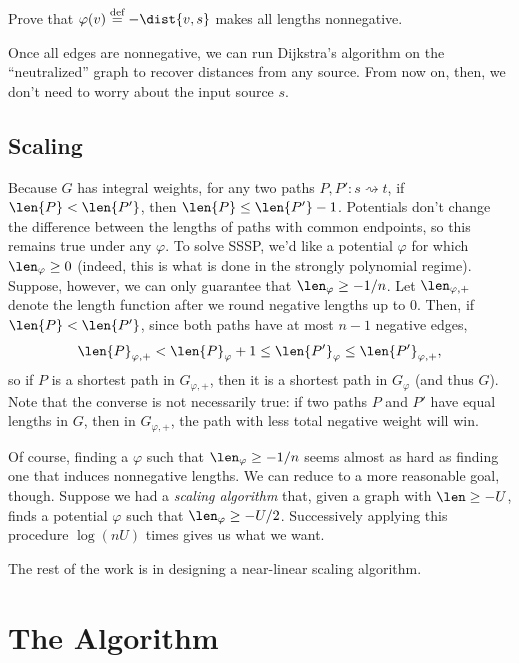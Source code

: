 \documentclass[12pt]{article}
\begin{document}
\begin{exercise}
  Prove that $\varphi(v) \defeq - \dist{v, s}$ makes all lengths nonnegative.
\end{exercise}

Once all edges are nonnegative, we can run Dijkstra's algorithm on the
``neutralized'' graph to recover distances from any source. From now on, then,
we don't need to worry about the input source $s$.

\subsection{Scaling}

Because $G$ has integral weights, for any two paths
$P, P' : s \rightsquigarrow t$, if $\len{P} < \len{P'}$, then
$\len{P} \leq \len{P'} - 1$. Potentials don't change the difference between the
lengths of paths with common endpoints, so this remains true under any
$\varphi$. To solve SSSP, we'd like a potential $\varphi$ for which
$\len_\varphi \geq 0$ (indeed, this is what is done in the strongly polynomial
regime). Suppose, however, we can only guarantee that $\len_\varphi \geq -1/n$.
Let $\len_{\varphi, +}$ denote the length function after we round negative
lengths up to $0$. Then, if $\len{P} < \len{P'}$, since both paths have at most
$n - 1$ negative edges,
\begin{align*}
  \len{P}_{\varphi, +} <    \len{P}_\varphi + 1
                       \leq \len{P'}_\varphi
                       \leq \len{P'}_{\varphi, +},
\end{align*}
so if $P$ is a shortest path in $G_{\varphi, +}$, then it is a shortest path in
$G_\varphi$ (and thus $G$). Note that the converse is not necessarily true: if
two paths $P$ and $P'$ have equal lengths in $G$, then in $G_{\varphi, +}$, the
path with less total negative weight will win.

Of course, finding a $\varphi$ such that $\len_\varphi \geq -1/n$ seems almost
as hard as finding one that induces nonnegative lengths. We can reduce to a more
reasonable goal, though. Suppose we had a \emph{scaling algorithm} that, given a
graph with $\len \geq -U$, finds a potential $\varphi$ such that
$\len_\varphi \geq -U/2$. Successively applying this procedure $\log(nU)$ times
gives us what we want.

The rest of the work is in designing a near-linear scaling algorithm.

\section{The Algorithm}
\end{document}
